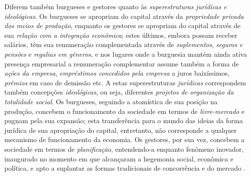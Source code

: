 Diferem também burgueses e gestores quanto às \textit{superestruturas jurídicas e ideológicas}. Os burgueses se apropriam do capital através da \textit{propriedade privada dos meios de produção}, enquanto os gestores se apropriam do capital através de sua \textit{relação com a integração econômica}; estes últimos, embora possam receber salários, têm sua remuneração complementada através de \textit{suplementos}, \textit{seguros e pensões} e \textit{regalias em gêneros}, e nos lugares onde a burguesia mantém ainda ativa presença empresarial a remuneração complementar assume também a forma de \textit{ações da empresa}, \textit{empréstimos concedidos pela empresa} a juros baixíssimos, \textit{prêmios} em caso de demissão etc. A estas superestruturas \textit{jurídicas} correspondem também concepções \textit{ideológicas}, ou seja, diferentes \textit{projetos de organização da totalidade social}. Os burgueses, seguindo a atomística de sua posição na produção, concebem o funcionamento da sociedade em termos de \textit{livre-mercado} e pugnam pela sua expansão; esta transferência para o mundo das ideias da forma jurídica de sua apropriação do capital, entretanto, não corresponde a qualquer mecanismo de funcionamento da economia. Os gestores, por sua vez, concebem a sociedade em termos de \textit{planificação}, entendendo-a enquanto fenômeno inovador, inaugurado no momento em que alcançaram a hegemonia social, econômica e política, e apto a suplantar as formas tradicionais de concorrência e do mercado \cite[p.~204-208]{BERNARDO1991}. 

